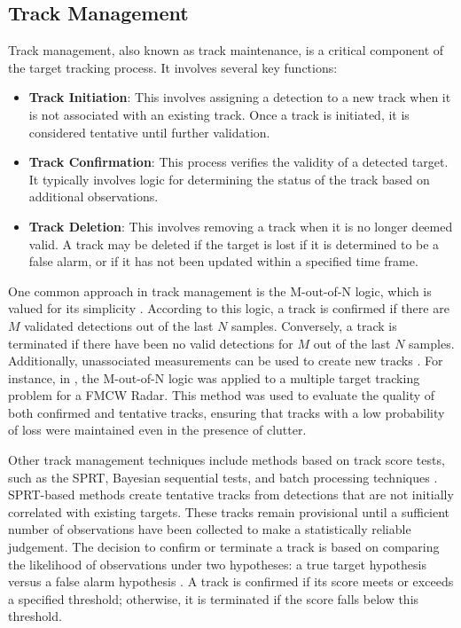 \subsection{Track Management}
Track management, also known as track maintenance, is a critical component of the target tracking process. It involves several key functions:
\begin{itemize}
    \item \textbf{Track Initiation}:
    \newline
    This involves assigning a detection to a new track when it is not associated with an existing track. Once a track is initiated, it is considered tentative until further validation.
    
    \item \textbf{Track Confirmation}:
    \newline
    This process verifies the validity of a detected target. It typically involves logic for determining the status of the track based on additional observations.
    
    \item \textbf{Track Deletion}:
    \newline
    This involves removing a track when it is no longer deemed valid. A track may be deleted if the target is lost if it is determined to be a false alarm, or if it has not been updated within a specified time frame.
\end{itemize}
One common approach in track management is the M-out-of-N logic, which is valued for its simplicity \cite{Boyer2012, Kim}. According to this logic, a track is confirmed if there are \(M\) validated detections out of the last \(N\) samples. Conversely, a track is terminated if there have been no valid detections for \(M\) out of the last \(N\) samples. Additionally, unassociated measurements can be used to create new tracks \cite{Braca2012}. For instance, in \cite{Kim2013}, the M-out-of-N logic was applied to a multiple target tracking problem for a \ac{FMCW} \ac{Radar}. This method was used to evaluate the quality of both confirmed and tentative tracks, ensuring that tracks with a low probability of loss were maintained even in the presence of clutter.

Other track management techniques include methods based on track score tests, such as the \ac{SPRT}, Bayesian sequential tests, and batch processing techniques \cite{Blanding2009, Blackman}. \ac{SPRT}-based methods create tentative tracks from detections that are not initially correlated with existing targets. These tracks remain provisional until a sufficient number of observations have been collected to make a statistically reliable judgement. The decision to confirm or terminate a track is based on comparing the likelihood of observations under two hypotheses: a true target hypothesis versus a false alarm hypothesis \cite{Blanding2009, Kajenski2011}. A track is confirmed if its score meets or exceeds a specified threshold; otherwise, it is terminated if the score falls below this threshold.

